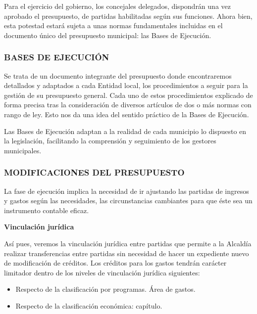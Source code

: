 \documentclass[
]{article}
\begin{document}
Para el ejercicio del gobierno, los concejales delegados, dispondrán una
vez aprobado el presupuesto, de partidas habilitadas según sus
funciones. Ahora bien, esta potestad estará sujeta a unas normas
fundamentales incluidas en el documento único del presupuesto municipal:
las Bases de Ejecución.

\hypertarget{bases-de-ejecuciuxf3n}{%
\subsubsection{BASES DE EJECUCIÓN}\label{bases-de-ejecuciuxf3n}}

Se trata de un documento integrante del presupuesto donde encontraremos
detallados y adaptados a cada Entidad local, los procedimientos a seguir
para la gestión de su presupuesto general. Cada uno de estos
procedimientos explicado de forma precisa tras la consideración de
diversos artículos de dos o más normas con rango de ley. Esto nos da una
idea del sentido práctico de la Bases de Ejecución.

Las Bases de Ejecución adaptan a la realidad de cada municipio lo
dispuesto en la legislación, facilitando la comprensión y seguimiento de
los gestores municipales.

\hypertarget{modificaciones-del-presupuesto}{%
\subsubsection{MODIFICACIONES DEL
PRESUPUESTO}\label{modificaciones-del-presupuesto}}

La fase de ejecución implica la necesidad de ir ajustando las partidas
de ingresos y gastos según las necesidades, las circunstancias
cambiantes para que éste sea un instrumento contable eficaz.

\textbf{Vinculación jurídica}

Así pues, veremos la vinculación jurídica entre partidas que permite a
la Alcaldía realizar transferencias entre partidas sin necesidad de
hacer un expediente nuevo de modificación de créditos. Los créditos para
los gastos tendrán carácter limitador dentro de los niveles de
vinculación jurídica siguientes:

\begin{itemize}
\item
  Respecto de la clasificación por programas. Área de gastos.
\item
  Respecto de la clasificación económica: capítulo.
\end{itemize}
\end{document}
